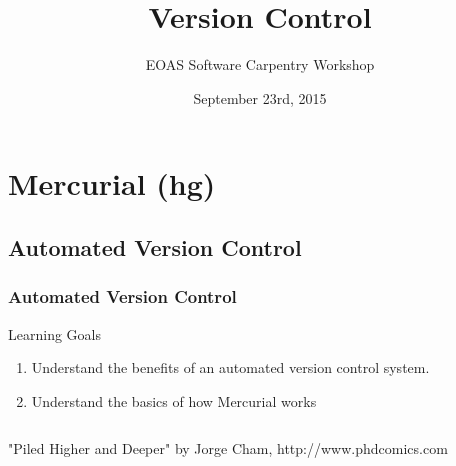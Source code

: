 \documentclass{beamer}
\title[Mercurial]{Version Control}
\subtitle[]{EOAS Software Carpentry Workshop }
\date[Sep 2015]{September 23rd, 2015}
\begin{document}
\section*{Mercurial (hg)}

\begin{frame}[plain] 
\titlepage
\end{frame}

\subsection*{Automated Version Control}
\begin{frame}
\frametitle{Automated Version Control}
\begin{block}{Learning Goals}
\begin{enumerate}
\item Understand the benefits of an automated version control system.
\item Understand the basics of how Mercurial works
\end{enumerate}
\end{block}
\end{frame}

\begin{frame}
\begin{columns}
"Piled Higher and Deeper" by Jorge Cham, http://www.phdcomics.com
\end{columns}
\end{frame}
\end{document}
